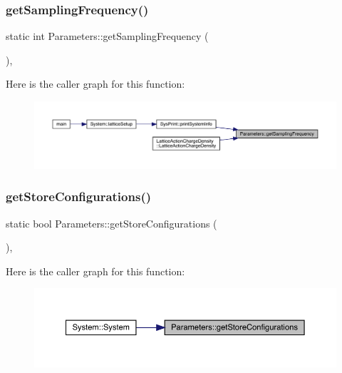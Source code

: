 \subsubsection{\texorpdfstring{getSamplingFrequency()}{getSamplingFrequency()}}
{\footnotesize\ttfamily static int Parameters\+::get\+Sampling\+Frequency (\begin{DoxyParamCaption}{ }\end{DoxyParamCaption})\hspace{0.3cm}{\ttfamily [inline]}, {\ttfamily [static]}}

Here is the caller graph for this function\+:
\nopagebreak
\begin{figure}[H]
\begin{center}
\leavevmode
\includegraphics[width=350pt]{class_parameters_a3b4e197b2569fb5465e0827430e45eb5_icgraph}
\end{center}
\end{figure}
\mbox{\label{class_parameters_a38f06b562355b56a1b1222e1cfe6735a}} 
\subsubsection{\texorpdfstring{getStoreConfigurations()}{getStoreConfigurations()}}
{\footnotesize\ttfamily static bool Parameters\+::get\+Store\+Configurations (\begin{DoxyParamCaption}{ }\end{DoxyParamCaption})\hspace{0.3cm}{\ttfamily [inline]}, {\ttfamily [static]}}

Here is the caller graph for this function\+:
\nopagebreak
\begin{figure}[H]
\begin{center}
\leavevmode
\includegraphics[width=350pt]{class_parameters_a38f06b562355b56a1b1222e1cfe6735a_icgraph}
\end{center}
\end{figure}
\mbox{\label{class_parameters_a216f85b3c5980a33f8a54c42fb3575c7}} 
